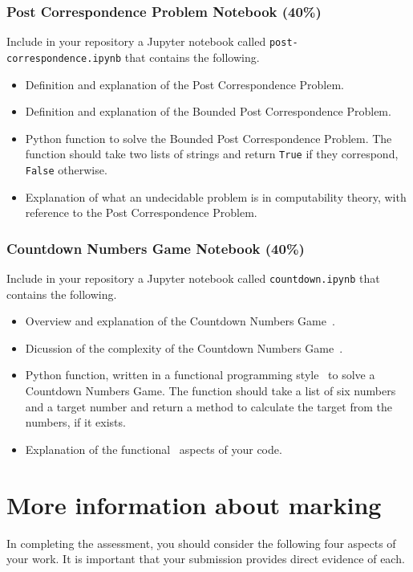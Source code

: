 \documentclass[a4paper, 12pt]{scrartcl}
\begin{document}
  \subsubsection*{Post Correspondence Problem Notebook (40\%)}
  Include in your repository a Jupyter notebook called \texttt{post-correspondence.ipynb} that contains the following.
  \begin{itemize}
    \item Definition and explanation of the Post Correspondence Problem.
    \item Definition and explanation of the Bounded Post Correspondence Problem.
    \item Python function to solve the Bounded Post Correspondence Problem. The function should take two lists of strings and return \texttt{True} if they correspond, \texttt{False} otherwise.
    \item Explanation of what an undecidable problem is in computability theory, with reference to the Post Correspondence Problem.
  \end{itemize}
  
  \subsubsection*{Countdown Numbers Game Notebook (40\%)}
  Include in your repository a Jupyter notebook called \texttt{countdown.ipynb} that contains the following.
  \begin{itemize}
    \item Overview and explanation of the Countdown Numbers Game~\cite{countdownnumbers}.
    \item Dicussion of the complexity of the Countdown Numbers Game~\cite{countdownnumbers}.
    \item Python function, written in a functional programming style~\cite{pythonfunctional} to solve a Countdown Numbers Game. The function should take a list of six numbers and a target number and return a method to calculate the target from the numbers, if it exists.
    \item Explanation of the functional~\cite{pythonfunctional} aspects of your code.
  \end{itemize}

  \section*{More information about marking}
    In completing the assessment, you should consider the following four aspects of your work.
    It is important that your submission provides direct evidence of each.
    
\end{document}
